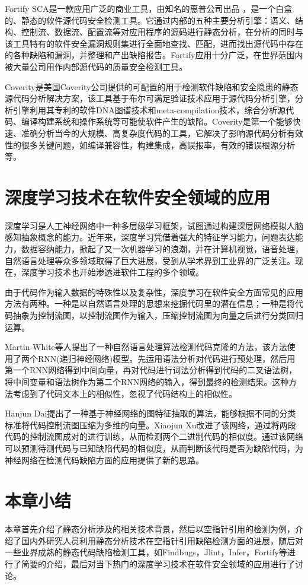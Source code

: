 Fortify SCA是一款应用广泛的商业工具，由知名的惠普公司出品 ，是一个白盒的、静态的软件源代码安全检测工具。它通过内部的五种主要分析引擎：语义、结构、控制流、数据流、配置流等对应用程序的源码进行静态分析，在分析的同时与该工具特有的软件安全漏洞规则集进行全面地查找、匹配，进而找出源代码中存在的各种缺陷和漏洞，并整理和产出缺陷报告。Fortify应用十分广泛，在世界范围内被大量公司用作内部源代码的质量安全检测工具。

Coverity是美国Coverity公司提供的可配置的用于检测软件缺陷和安全隐患的静态源代码分析解决方案，该工具基于布尔可满足验证技术应用于源代码分析引擎，分析引擎利用其专利的软件DNA图谱技术和meta-compilation技术，综合分析源代码、编译构建系统和操作系统等可能使软件产生的缺陷。Coverity是第一个能够快速、准确分析当今的大规模、高复杂度代码的工具，它解决了影响源代码分析有效性的很多关键问题，如编译兼容性，构建集成，高误报率，有效的错误根源分析等。

\section{深度学习技术在软件安全领域的应用}
深度学习是人工神经网络中一种多层级学习框架，试图通过构建深层网络模拟人脑感知抽象概念的能力。近年来，深度学习凭借着强大的特征学习能力，问题表达能力，数据容纳能力，掀起了又一次机器学习的浪潮，并在计算机视觉，语音处理，自然语言处理等众多领域取得了巨大进展，受到从学术界到工业界的广泛关注。现在，深度学习技术也开始渗透进软件工程的多个领域。

由于代码作为输入数据的特殊性以及复杂性，深度学习在软件安全方面常见的应用方法有两种。一种是以自然语言处理的思想来挖掘代码里的潜在信息；一种是将代码抽象为控制流图，以控制流图作为输入，压缩控制流图为向量之后进行分类回归运算。

Martin White\cite{white2016deep}等人提出了一种自然语言处理算法检测代码克隆的方法，该方法使用了两个RNN(递归神经网络)模型。先运用语法分析对代码进行预处理，然后用第一个RNN网络得到中间向量，再对代码进行词法分析得到代码的二叉语法树，将中间变量和语法树作为第二个RNN网络的输入，得到最终的检测结果。这种方法考虑到了代码文本上的相似性，忽视了代码结构上的相似性。

Hanjun Dai\cite{dai2016discriminative}提出了一种基于神经网络的图特征抽取的算法，能够根据不同的分类标准将代码控制流图压缩为多维的向量。Xiaojun Xu\cite{DBLP:journals/corr/abs-1708-06525}改进了该网络，通过将两段代码的控制流图成对的进行训练，从而检测两个二进制代码的相似度。通过该网络可以预测待测代码与已知缺陷代码的相似度，从而判断该代码是否为缺陷代码，为神经网络在检测代码缺陷方面的应用提供了新的思路。

\section{本章小结}
本章首先介绍了静态分析涉及的相关技术背景，然后以空指针引用的检测为例，介绍了国内外研究人员利用静态分析技术在空指针引用缺陷检测方面的进展，随后对一些业界成熟的静态代码缺陷检测工具，如Findbugs，Jlint，Infer，Fortify等进行了简要的介绍，最后对当下热门的深度学习技术在软件安全领域的应用进行了讨论。